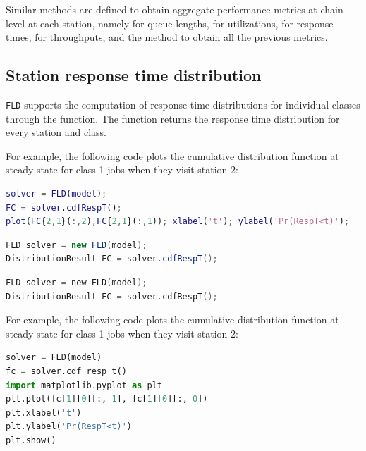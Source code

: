 Similar methods are defined to obtain aggregate performance metrics at chain level at each station, namely  for queue-lengths,  for utilizations,  for response times,  for throughputs, and the  method to obtain all the previous metrics.

\subsection{Station response time distribution}
\texttt{FLD} supports the computation of response time distributions for individual classes through the  function. The function returns the response time distribution for every station and class. 
\begin{MATLAB}
For example, the following code plots the cumulative distribution function at steady-state for class 1 jobs when they visit station 2:
\begin{lstlisting}[language = matlab]
solver = FLD(model);
FC = solver.cdfRespT();
plot(FC{2,1}(:,2),FC{2,1}(:,1)); xlabel('t'); ylabel('Pr(RespT<t)');
\end{lstlisting}
\end{MATLAB}
\begin{JAVA}
\begin{lstlisting}[language=java, basicstyle=\ttfamily\scriptsize]
FLD solver = new FLD(model);
DistributionResult FC = solver.cdfRespT();
\end{lstlisting}
\end{JAVA}
\begin{KOTLIN}
\begin{lstlisting}[language=kotlin, basicstyle=\ttfamily\scriptsize]
FLD solver = new FLD(model);
DistributionResult FC = solver.cdfRespT();
\end{lstlisting}
\end{KOTLIN}
\begin{PYTHON}
For example, the following code plots the cumulative distribution function at steady-state for class 1 jobs when they visit station 2:
\begin{lstlisting}[language=python]
solver = FLD(model)
fc = solver.cdf_resp_t()
import matplotlib.pyplot as plt
plt.plot(fc[1][0][:, 1], fc[1][0][:, 0])
plt.xlabel('t')
plt.ylabel('Pr(RespT<t)')
plt.show()
\end{lstlisting}
\end{PYTHON}

